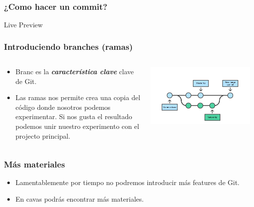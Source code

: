 \documentclass[10pt, aspectratio=169, compress]{beamer}
\begin{document}
\begin{frame}
	\frametitle{¿Como hacer un commit?}

	\begin{center}
		Live Preview
	\end{center}

\end{frame}
\begin{frame}
	\frametitle{Introduciendo branches (ramas)}

	\begin{columns}
		\begin{column}{0.5\textwidth}
			\begin{itemize}
				\item Branc es la \textbf{\textit{característica clave}} clave de Git.
				\item Las ramas nos permite crea una copia del código donde nosotros podemos experimentar. Si nos gusta el resultado podemos unir nuestro experimento con el projecto principal.
			\end{itemize}
		\end{column}
		\begin{column}{0.5\textwidth}
			\begin{center}
			 \includegraphics[width=1\textwidth]{git.png}
			 \end{center}
		\end{column}
	\end{columns}

\end{frame}
\begin{frame}
	\frametitle{Más materiales}

	\begin{itemize}
		\item Lamentablemente por tiempo no podremos introducir más features de Git. 
		\item En cavas podrás encontrar más materiales.
	\end{itemize}
\end{frame}
\end{document}
